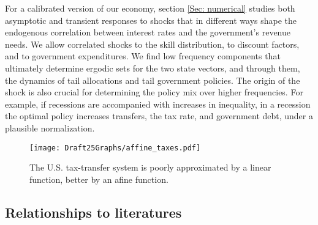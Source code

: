 \documentclass[thmsb,11pt]{article}
\begin{document}

 For a calibrated version of our economy, section \ref{Sec: numerical} studies both asymptotic and transient responses to shocks
 that    in different ways shape the endogenous correlation between interest rates and the government's revenue needs.  We allow correlated shocks
 to the skill distribution, to discount factors, and to government expenditures.
We find  low frequency components that ultimately determine  ergodic sets for the two state vectors, and through them, the dynamics of tail allocations and tail government policies.  The origin of the shock is also crucial for determining the policy mix over higher frequencies. For example, if recessions are accompanied with increases in inequality, in a recession the optimal policy increases  transfers, the tax rate, and   government debt, under a plausible
normalization.




  \begin{figure}[htp]
 \centering
 \texttt{[image: Draft25Graphs/affine\_taxes.pdf]}
 \caption{ The U.S. tax-transfer system is poorly approximated by a linear function, better by an afine
function.}
 \label{fig:affine_taxes}
 \end{figure}


\subsection{Relationships to literatures}
\end{document}
